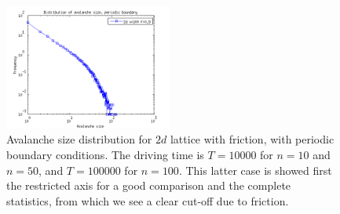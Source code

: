 \begin{figure}
\begin{center}
\includegraphics[width=0.49\textwidth]{results/spf100a.png}
\caption{Avalanche size distribution for $2d$ lattice with friction, with periodic boundary conditions. 
The driving time is $T=10000$ for $n=10$ and $n=50$, and $T=100000$ for $n=100$. 
This latter case is showed first the restricted axis for a good comparison and the complete statistics, from which we see a clear cut-off due to friction.  }
\label{spf}
\end{center}
\end{figure} 



